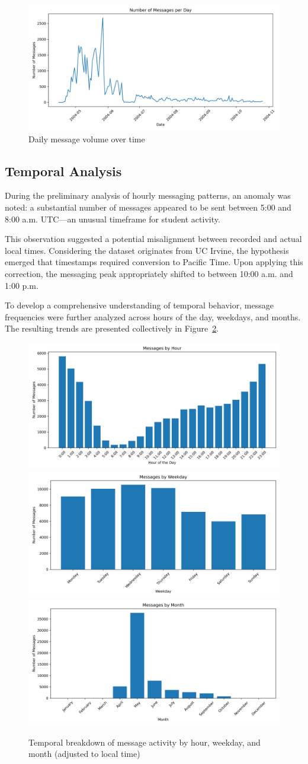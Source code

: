 \begin{figure}[H]
    \centering
    \includegraphics[width=0.5\linewidth]{../Images/messages_per_day.png}
    \caption{Daily message volume over time}
    \label{fig:messages-per-day}
\end{figure}

\subsection{Temporal Analysis}

During the preliminary analysis of hourly messaging patterns, an anomaly was noted: a substantial number of messages appeared to be sent between 5:00 and 8:00 a.m. UTC—an unusual timeframe for student activity.

This observation suggested a potential misalignment between recorded and actual local times. Considering the dataset originates from UC Irvine, the hypothesis emerged that timestamps required conversion to Pacific Time. Upon applying this correction, the messaging peak appropriately shifted to between 10:00 a.m. and 1:00 p.m.

To develop a comprehensive understanding of temporal behavior, message frequencies were further analyzed across hours of the day, weekdays, and months. The resulting trends are presented collectively in Figure~\ref{fig:temporal-analysis}.

\begin{figure}[H]
    \centering
    \includegraphics[width=0.3\linewidth]{../Images/messages_by_hour.png}
    \includegraphics[width=0.3\linewidth]{../Images/messages_by_weekday.png}
    \includegraphics[width=0.3\linewidth]{../Images/messages_by_month.png}
    \caption{Temporal breakdown of message activity by hour, weekday, and month (adjusted to local time)}
    \label{fig:temporal-analysis}
\end{figure}

